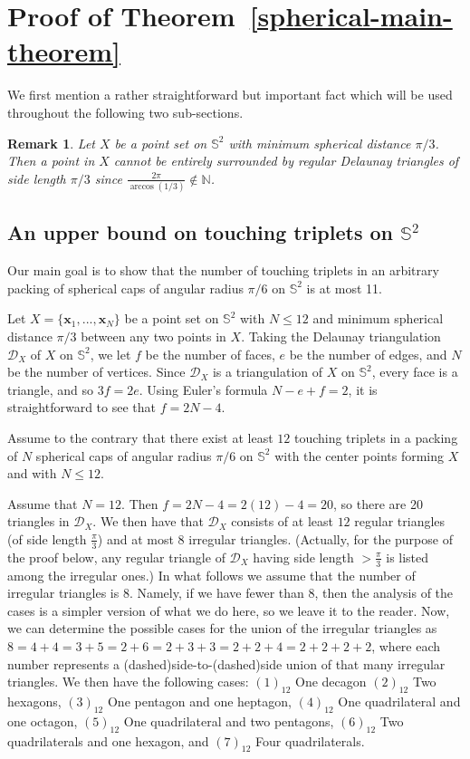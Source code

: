 \documentclass[10pt]{article}
\newtheorem{Remark}{Remark}
\numberwithin{Subcase}{Case}
\begin{document}
\section{Proof of Theorem~\ref{spherical-main-theorem}}



We first mention a rather straightforward but important fact which will be used throughout the following two sub-sections.

\begin{Remark}\label{trivial}
Let $X$ be a point set on $\mathbb{S}^2$ with minimum spherical distance $\pi/3$. Then
a point in $X$ cannot be entirely surrounded by regular Delaunay triangles of side length $\pi/3$ since $\frac{2\pi} {\arccos(1/3)} \notin \mathbb{N}$.
\end{Remark}



\subsection{An upper bound on touching triplets on $\mathbb{S}^2$}

Our main goal is to show that the number of touching triplets in an arbitrary packing of spherical caps of angular radius $\pi/6$ on $\mathbb{S}^2$ is at most 11.

Let $X=\{\mathbf{x}_{1},...,\mathbf{x}_{N}\}$ be a point set on $\mathbb{S}^2$ with $N \leq 12$ and minimum spherical distance $\pi/3$ between any two points in $X$. Taking the Delaunay triangulation $\mathcal{D}_{X}$ of $X$ on $\mathbb{S}^2$, we let $f$ be the number of faces, $e$ be the number of edges, and $N$ be the number of vertices. Since $\mathcal{D}_{X}$ is a triangulation of $X$ on $\mathbb{S}^2$, every face is a triangle, and so $3f=2e$. Using Euler's formula $N-e+f=2$, it is straightforward to see that $f=2N-4$. 

Assume to the contrary that there exist at least $12$ touching triplets in a packing of $N$  spherical caps of angular radius $\pi/6$ on $\mathbb{S}^2$ with the center points forming $X$ and with $N\le 12$.

Assume that $N=12$. Then $f=2N-4=2(12)-4=20$, so there are 20 triangles in $\mathcal{D}_{X}$. We then have that $\mathcal{D}_{X}$ consists of at least $12$ regular triangles (of side length $\frac{\pi}{3}$) and at most $8$ irregular triangles. (Actually, for the purpose of the proof below, any regular triangle of $\mathcal{D}_{X}$ having side length $>\frac{\pi}{3}$ is listed among the irregular ones.) In what follows we assume that the number of irregular triangles is $8$. Namely, if we have fewer than $8$, then the analysis of the cases is a simpler version of what we do here, so we leave it to the reader. Now, we can determine the possible cases for the union of the irregular triangles as $8=4+4=3+5=2+6=2+3+3=2+2+4=2+2+2+2$, where each number represents a (dashed)side-to-(dashed)side union of that many irregular triangles. We then have the following cases: $(1)_{12}$ One decagon $(2)_{12}$ Two hexagons, $(3)_{12}$ One pentagon and one heptagon, $(4)_{12}$ One quadrilateral and one octagon, $(5)_{12}$ One quadrilateral and two pentagons, $(6)_{12}$ Two quadrilaterals and one hexagon, and $(7)_{12}$ Four quadrilaterals.
\end{document}

